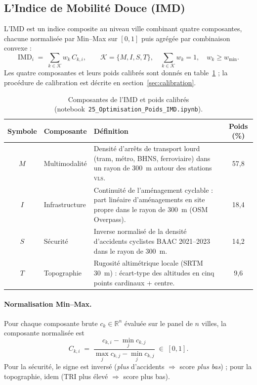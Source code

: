 \documentclass[11pt,a4paper]{article}
\newcommand{\IMD}{\mathrm{IMD}}
\newcommand{\VLS}{\textsc{vls}\xspace}
\begin{document}
\subsection{L'Indice de Mobilité Douce (IMD)}

L'IMD est un indice composite au niveau ville combinant quatre
composantes, chacune normalisée par Min--Max sur $[0, 1]$ puis
agrégée par combinaison convexe :
\begin{equation}
    \IMD_i \;=\;
    \sum_{k\in\mathcal{K}} w_k\, C_{k,i},
    \qquad \mathcal{K} = \{M, I, S, T\},
    \quad \sum_{k\in\mathcal{K}} w_k = 1,
    \quad w_k \geq w_{\min}.
    \label{eq:imd}
\end{equation}
Les quatre composantes et leurs poids calibrés sont donnés en
table~\ref{tab:components} ; la procédure de calibration est
décrite en section~\ref{sec:calibration}.

\begin{table}[H]
\centering
\caption{Composantes de l'IMD et poids calibrés
(notebook~\texttt{25\_Optimisation\_Poids\_IMD.ipynb}).}
\label{tab:components}
\small
\begin{tabular}{@{}clp{8cm}c@{}}
\toprule
\textbf{Symbole} & \textbf{Composante} & \textbf{Définition} &
\textbf{Poids (\%)} \\
\midrule
$M$ & Multimodalité & Densité d'arrêts de transport lourd (tram,
métro, BHNS, ferroviaire) dans un rayon de \SI{300}{\metre}
autour des stations \VLS. & 57,8 \\
$I$ & Infrastructure & Continuité de l'aménagement cyclable : part
linéaire d'aménagements en site propre dans le rayon de
\SI{300}{\metre} (OSM Overpass). & 18,4 \\
$S$ & Sécurité & Inverse normalisé de la densité d'accidents
cyclistes BAAC 2021--2023 dans le rayon de \SI{300}{\metre}. &
14,2 \\
$T$ & Topographie & Rugosité altimétrique locale (SRTM
\SI{30}{\metre}) : écart-type des altitudes en cinq points
cardinaux + centre. & 9,6 \\
\bottomrule
\end{tabular}
\end{table}

\paragraph{Normalisation Min--Max.}
Pour chaque composante brute $c_k \in \mathbb{R}^{n}$ évaluée sur
le panel de $n$ villes, la composante normalisée est
\begin{equation*}
    C_{k,i} \;=\;
    \frac{c_{k,i} - \min_{j} c_{k,j}}
         {\max_{j} c_{k,j} - \min_{j} c_{k,j}} \;\in\; [0, 1].
\end{equation*}
Pour la sécurité, le signe est inversé (\emph{plus} d'accidents
$\Rightarrow$ score \emph{plus bas}) ; pour la topographie, idem
($\mathrm{TRI}$ plus élevé $\Rightarrow$ score plus bas).
\end{document}
